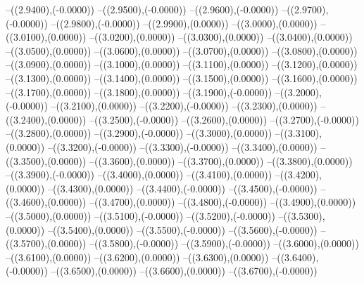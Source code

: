 {	--({\sx*(2.9400)},{\sy*(-0.0000)})
	--({\sx*(2.9500)},{\sy*(-0.0000)})
	--({\sx*(2.9600)},{\sy*(-0.0000)})
	--({\sx*(2.9700)},{\sy*(-0.0000)})
	--({\sx*(2.9800)},{\sy*(-0.0000)})
	--({\sx*(2.9900)},{\sy*(0.0000)})
	--({\sx*(3.0000)},{\sy*(0.0000)})
	--({\sx*(3.0100)},{\sy*(0.0000)})
	--({\sx*(3.0200)},{\sy*(0.0000)})
	--({\sx*(3.0300)},{\sy*(0.0000)})
	--({\sx*(3.0400)},{\sy*(0.0000)})
	--({\sx*(3.0500)},{\sy*(0.0000)})
	--({\sx*(3.0600)},{\sy*(0.0000)})
	--({\sx*(3.0700)},{\sy*(0.0000)})
	--({\sx*(3.0800)},{\sy*(0.0000)})
	--({\sx*(3.0900)},{\sy*(0.0000)})
	--({\sx*(3.1000)},{\sy*(0.0000)})
	--({\sx*(3.1100)},{\sy*(0.0000)})
	--({\sx*(3.1200)},{\sy*(0.0000)})
	--({\sx*(3.1300)},{\sy*(0.0000)})
	--({\sx*(3.1400)},{\sy*(0.0000)})
	--({\sx*(3.1500)},{\sy*(0.0000)})
	--({\sx*(3.1600)},{\sy*(0.0000)})
	--({\sx*(3.1700)},{\sy*(0.0000)})
	--({\sx*(3.1800)},{\sy*(0.0000)})
	--({\sx*(3.1900)},{\sy*(-0.0000)})
	--({\sx*(3.2000)},{\sy*(-0.0000)})
	--({\sx*(3.2100)},{\sy*(0.0000)})
	--({\sx*(3.2200)},{\sy*(-0.0000)})
	--({\sx*(3.2300)},{\sy*(0.0000)})
	--({\sx*(3.2400)},{\sy*(0.0000)})
	--({\sx*(3.2500)},{\sy*(-0.0000)})
	--({\sx*(3.2600)},{\sy*(0.0000)})
	--({\sx*(3.2700)},{\sy*(-0.0000)})
	--({\sx*(3.2800)},{\sy*(0.0000)})
	--({\sx*(3.2900)},{\sy*(-0.0000)})
	--({\sx*(3.3000)},{\sy*(0.0000)})
	--({\sx*(3.3100)},{\sy*(0.0000)})
	--({\sx*(3.3200)},{\sy*(-0.0000)})
	--({\sx*(3.3300)},{\sy*(-0.0000)})
	--({\sx*(3.3400)},{\sy*(0.0000)})
	--({\sx*(3.3500)},{\sy*(0.0000)})
	--({\sx*(3.3600)},{\sy*(0.0000)})
	--({\sx*(3.3700)},{\sy*(0.0000)})
	--({\sx*(3.3800)},{\sy*(0.0000)})
	--({\sx*(3.3900)},{\sy*(-0.0000)})
	--({\sx*(3.4000)},{\sy*(0.0000)})
	--({\sx*(3.4100)},{\sy*(0.0000)})
	--({\sx*(3.4200)},{\sy*(0.0000)})
	--({\sx*(3.4300)},{\sy*(0.0000)})
	--({\sx*(3.4400)},{\sy*(-0.0000)})
	--({\sx*(3.4500)},{\sy*(-0.0000)})
	--({\sx*(3.4600)},{\sy*(0.0000)})
	--({\sx*(3.4700)},{\sy*(0.0000)})
	--({\sx*(3.4800)},{\sy*(-0.0000)})
	--({\sx*(3.4900)},{\sy*(0.0000)})
	--({\sx*(3.5000)},{\sy*(0.0000)})
	--({\sx*(3.5100)},{\sy*(-0.0000)})
	--({\sx*(3.5200)},{\sy*(-0.0000)})
	--({\sx*(3.5300)},{\sy*(0.0000)})
	--({\sx*(3.5400)},{\sy*(0.0000)})
	--({\sx*(3.5500)},{\sy*(-0.0000)})
	--({\sx*(3.5600)},{\sy*(-0.0000)})
	--({\sx*(3.5700)},{\sy*(0.0000)})
	--({\sx*(3.5800)},{\sy*(-0.0000)})
	--({\sx*(3.5900)},{\sy*(-0.0000)})
	--({\sx*(3.6000)},{\sy*(0.0000)})
	--({\sx*(3.6100)},{\sy*(0.0000)})
	--({\sx*(3.6200)},{\sy*(0.0000)})
	--({\sx*(3.6300)},{\sy*(0.0000)})
	--({\sx*(3.6400)},{\sy*(-0.0000)})
	--({\sx*(3.6500)},{\sy*(0.0000)})
	--({\sx*(3.6600)},{\sy*(0.0000)})
	--({\sx*(3.6700)},{\sy*(-0.0000)})
}
